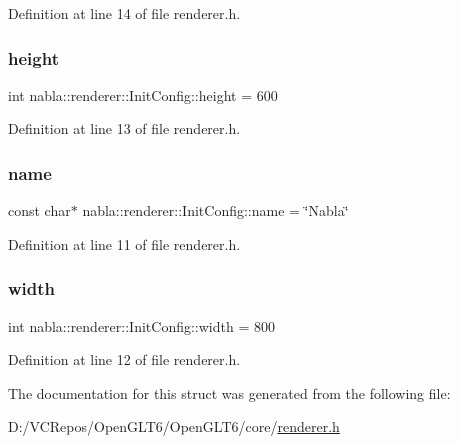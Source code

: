 Definition at line 14 of file renderer.\+h.

\mbox{\label{structnabla_1_1renderer_1_1_init_config_a334c731062f3de409f333b9115d5f125}} 
\subsubsection{\texorpdfstring{height}{height}}
{\footnotesize\ttfamily int nabla\+::renderer\+::\+Init\+Config\+::height = 600}



Definition at line 13 of file renderer.\+h.

\mbox{\label{structnabla_1_1renderer_1_1_init_config_a287d9aafaf6a59688754aad2742e4860}} 
\subsubsection{\texorpdfstring{name}{name}}
{\footnotesize\ttfamily const char$\ast$ nabla\+::renderer\+::\+Init\+Config\+::name = \char`\"{}Nabla\char`\"{}}



Definition at line 11 of file renderer.\+h.

\mbox{\label{structnabla_1_1renderer_1_1_init_config_ac9ec130f38b0baec8c4df6dcaaf40265}} 
\subsubsection{\texorpdfstring{width}{width}}
{\footnotesize\ttfamily int nabla\+::renderer\+::\+Init\+Config\+::width = 800}



Definition at line 12 of file renderer.\+h.



The documentation for this struct was generated from the following file\+:\begin{DoxyCompactItemize}
\item 
D\+:/\+V\+C\+Repos/\+Open\+G\+L\+T6/\+Open\+G\+L\+T6/core/\mbox{\hyperlink{renderer_8h}{renderer.\+h}}\end{DoxyCompactItemize}
